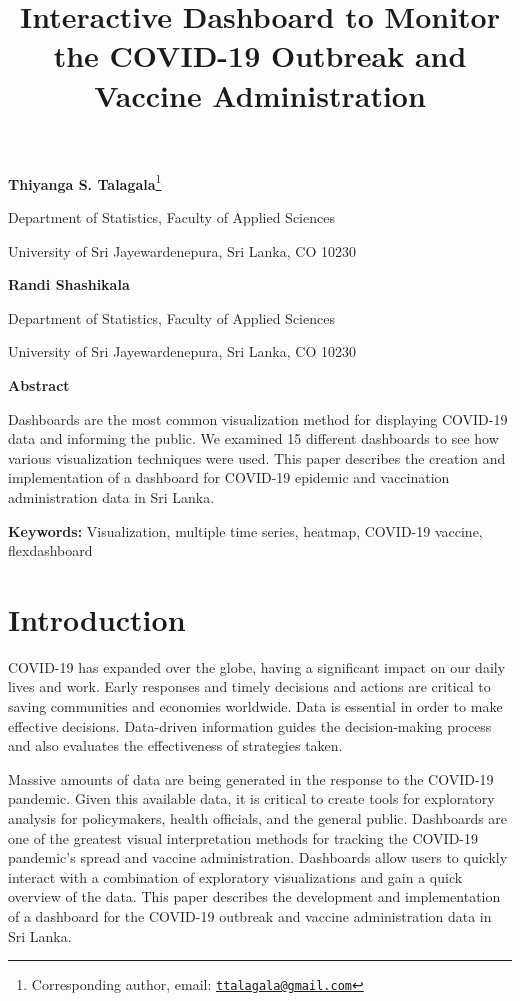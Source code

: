 \documentclass[
]{article}
\title{Interactive Dashboard to Monitor the COVID-19 Outbreak and
Vaccine Administration}
\author{}
\date{\vspace{-2.5em}}
\begin{document}
\maketitle

\textbf{Thiyanga S. Talagala}\footnote{Corresponding author, email:
  \href{mailto:ttalagala@gmail.com}{\nolinkurl{ttalagala@gmail.com}}}

Department of Statistics, Faculty of Applied Sciences

University of Sri Jayewardenepura, Sri Lanka, CO 10230

\hspace{3cm}

\textbf{Randi Shashikala}

Department of Statistics, Faculty of Applied Sciences

University of Sri Jayewardenepura, Sri Lanka, CO 10230

\hspace{3cm}

\textbf{Abstract}

Dashboards are the most common visualization method for displaying
COVID-19 data and informing the public. We examined 15 different
dashboards to see how various visualization techniques were used. This
paper describes the creation and implementation of a dashboard for
COVID-19 epidemic and vaccination administration data in Sri Lanka.

\textbf{Keywords:} Visualization, multiple time series, heatmap,
COVID-19 vaccine, flexdashboard

\hypertarget{introduction}{%
\section{Introduction}\label{introduction}}

COVID-19 has expanded over the globe, having a significant impact on our
daily lives and work. Early responses and timely decisions and actions
are critical to saving communities and economies worldwide. Data is
essential in order to make effective decisions. Data-driven information
guides the decision-making process and also evaluates the effectiveness
of strategies taken.

Massive amounts of data are being generated in the response to the
COVID-19 pandemic. Given this available data, it is critical to create
tools for exploratory analysis for policymakers, health officials, and
the general public. Dashboards are one of the greatest visual
interpretation methods for tracking the COVID-19 pandemic's spread and
vaccine administration. Dashboards allow users to quickly interact with
a combination of exploratory visualizations and gain a quick overview of
the data. This paper describes the development and implementation of a
dashboard for the COVID-19 outbreak and vaccine administration data in
Sri Lanka.
\end{document}

